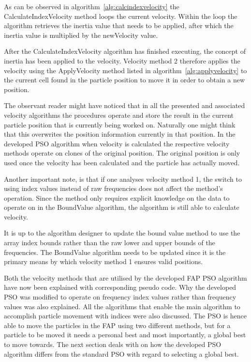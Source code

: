 As can be observed in algorithm~\ref{alg:calcindexvelocity} the CalculateIndexVelocity method loops the current velocity. Within the loop the algorithm retrieves the inertia value that needs to be applied, after which the inertia value is multiplied by the newVelocity value.

After the CalculateIndexVelocity algorithm has finished executing, the concept of inertia has been applied to the velocity. Velocity method 2 therefore applies the velocity using the ApplyVelocity method listed in algorithm~\ref{alg:applyvelocity} to the current cell found in the particle position to move it in order to obtain a new position.

The observant reader might have noticed that in all the presented and associated velocity algorithms the procedures operate and store the result in the current particle position that is currently being worked on. Naturally one might think that this overwrites the position information currently in that position. In the developed \gls{PSO} algorithm when velocity is calculated the respective velocity methods operate on clones of the original position. The original position is only used once the velocity has been calculated and the particle has actually moved.

Another important note, is that if one analyses velocity method 1, the switch to using index values instead of raw frequencies does not affect the method's operation. Since the method only requires explicit knowledge on the data to operate on in the BoundValue algorithm, the algorithm is still able to calculate velocity. 

It is up to the algorithm designer to update the bound value method to use the array index bounds rather than the raw lower and upper bounds of the frequencies. The BoundValue algorithm needs to be updated since it is the primary means by which velocity method 1 ensures valid positions.

Both the velocity methods that are utilised by the developed \gls{FAP} \gls{PSO} algorithm have now been explained with corresponding pseudo code. Why the developed \gls{PSO} was modified to operate on frequency index values rather than frequency values was also explained. All the algorithms that enable the main algorithm to accomplish particle movement with indices were also discussed. The \gls{PSO} is hence able to move the particles in the \gls{FAP} using two different methods, but for a particle to be moved it needs a personal best and most importantly, a global best to move towards. The next section deals with on how the developed \gls{PSO} algorithm differs from the standard \gls{PSO} with regard to selecting a global best.

